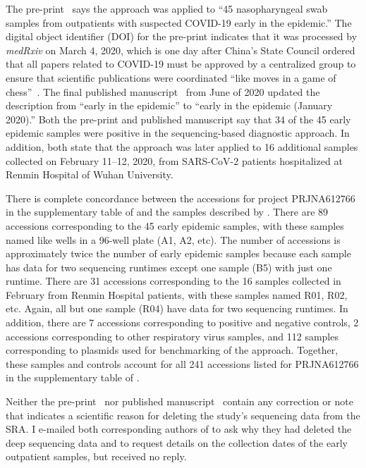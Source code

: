 \documentclass[9pt,twocolumn,twoside]{gsajnl_modified}
\begin{document}
The pre-print~\citep{wang2020medRxiv} says the approach was applied to ``45 nasopharyngeal swab samples from outpatients with suspected COVID-19 early in the epidemic.''
The digital object identifier (DOI) for the pre-print indicates that it was processed by \textit{medRxiv} on March 4, 2020, which is one day after China's State Council ordered that all papers related to COVID-19 must be approved by a centralized group to ensure that scientific publications were coordinated ``like moves in a game of chess''~\citep{Kang2020}.
The final published manuscript~\citep{wang2020small} from June of 2020 updated the description from ``early in the epidemic'' to ``early in the epidemic (January 2020).''
Both the pre-print and published manuscript say that 34 of the 45 early epidemic samples were positive in the sequencing-based diagnostic approach.
In addition, both state that the approach was later applied to 16 additional samples collected on February 11--12, 2020, from SARS-CoV-2 patients hospitalized at Renmin Hospital of Wuhan University.

There is complete concordance between the accessions for project PRJNA612766 in the supplementary table of \citet{farkas2020insights} and the samples described by \citet{wang2020medRxiv}.
There are 89 accessions corresponding to the 45 early epidemic samples, with these samples named like wells in a 96-well plate (A1, A2, etc).
The number of accessions is approximately twice the number of early epidemic samples because each sample has data for two sequencing runtimes except one sample (B5) with just one runtime.
 There are 31 accessions corresponding to the 16 samples collected in February from Renmin Hospital patients, with these samples named R01, R02, etc.
 Again, all but one sample (R04) have data for two sequencing runtimes.
 In addition, there are 7 accessions corresponding to positive and negative controls, 2 accessions corresponding to other respiratory virus samples, and 112 samples corresponding to plasmids used for benchmarking of the approach.
 Together, these samples and controls account for all 241 accessions listed for PRJNA612766 in the supplementary table of \citet{farkas2020insights}.

Neither the pre-print~\citep{wang2020medRxiv} nor published manuscript~\citep{wang2020small} contain any correction or note that indicates a scientific reason for deleting the study's sequencing data from the SRA.
I e-mailed both corresponding authors of \citet{wang2020medRxiv} to ask why they had deleted the deep sequencing data and to request details on the collection dates of the early outpatient samples, but received no reply.
\end{document}
